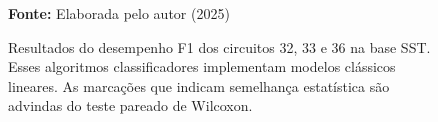\begin{figure}
\caption{Resultados do desempenho F1 dos circuitos 32, 33 e 36 na base \gls{SST}. Esses algoritmos classificadores implementam modelos clássicos lineares. As marcações que indicam semelhança estatística são advindas do teste pareado de Wilcoxon.}
\label{fig:f1:sst:g4}
     \centering
    \centering

      \par\medskip\ABNTEXfontereduzida\selectfont\textbf{Fonte:} Elaborada pelo autor (2025) \par\medskip
\end{figure}